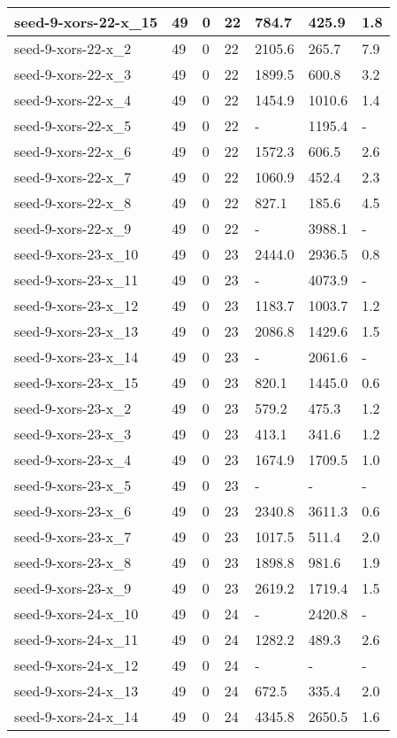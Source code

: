 \begin{scriptsize}
\begin{longtable}{|p{5cm}|l|l|l|l|l|l|}
seed-9-xors-22-x\_15&49&0&22&784.7&425.9&1.8 \\ \hline 
seed-9-xors-22-x\_2&49&0&22&2105.6&265.7&7.9 \\ \hline 
seed-9-xors-22-x\_3&49&0&22&1899.5&600.8&3.2 \\ \hline 
seed-9-xors-22-x\_4&49&0&22&1454.9&1010.6&1.4 \\ \hline 
seed-9-xors-22-x\_5&49&0&22&-&1195.4&- \\ \hline 
seed-9-xors-22-x\_6&49&0&22&1572.3&606.5&2.6 \\ \hline 
seed-9-xors-22-x\_7&49&0&22&1060.9&452.4&2.3 \\ \hline 
seed-9-xors-22-x\_8&49&0&22&827.1&185.6&4.5 \\ \hline 
seed-9-xors-22-x\_9&49&0&22&-&3988.1&- \\ \hline 
seed-9-xors-23-x\_10&49&0&23&2444.0&2936.5&0.8 \\ \hline 
seed-9-xors-23-x\_11&49&0&23&-&4073.9&- \\ \hline 
seed-9-xors-23-x\_12&49&0&23&1183.7&1003.7&1.2 \\ \hline 
seed-9-xors-23-x\_13&49&0&23&2086.8&1429.6&1.5 \\ \hline 
seed-9-xors-23-x\_14&49&0&23&-&2061.6&- \\ \hline 
seed-9-xors-23-x\_15&49&0&23&820.1&1445.0&0.6 \\ \hline 
seed-9-xors-23-x\_2&49&0&23&579.2&475.3&1.2 \\ \hline 
seed-9-xors-23-x\_3&49&0&23&413.1&341.6&1.2 \\ \hline 
seed-9-xors-23-x\_4&49&0&23&1674.9&1709.5&1.0 \\ \hline 
seed-9-xors-23-x\_5&49&0&23&-&-&- \\ \hline 
seed-9-xors-23-x\_6&49&0&23&2340.8&3611.3&0.6 \\ \hline 
seed-9-xors-23-x\_7&49&0&23&1017.5&511.4&2.0 \\ \hline 
seed-9-xors-23-x\_8&49&0&23&1898.8&981.6&1.9 \\ \hline 
seed-9-xors-23-x\_9&49&0&23&2619.2&1719.4&1.5 \\ \hline 
seed-9-xors-24-x\_10&49&0&24&-&2420.8&- \\ \hline 
seed-9-xors-24-x\_11&49&0&24&1282.2&489.3&2.6 \\ \hline 
seed-9-xors-24-x\_12&49&0&24&-&-&- \\ \hline 
seed-9-xors-24-x\_13&49&0&24&672.5&335.4&2.0 \\ \hline 
seed-9-xors-24-x\_14&49&0&24&4345.8&2650.5&1.6 \\ \hline 

\end{longtable}
\end{scriptsize}
